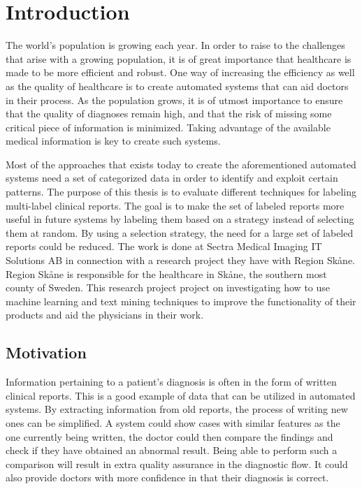 \chapter{Introduction}
\label{cha:introduction}

The world's population is growing each year. 
In order to raise to the challenges that arise with a growing population, it is of great importance that healthcare is made to be more efficient and robust.
One way of increasing the efficiency as well as the quality of healthcare is to create automated systems that can aid doctors in their process.
As the population grows, it is of utmost importance to ensure that the quality of diagnoses remain high, and that the risk of missing some critical piece of information is minimized.
Taking advantage of the available medical information is key to create such systems.

Most of the approaches that exists today to create the aforementioned automated systems need a set of categorized data in order to identify and exploit certain patterns.
The purpose of this thesis is to evaluate different techniques for labeling multi-label clinical reports.
The goal is to make the set of labeled reports more useful in future systems by labeling them based on a strategy instead of selecting them at random.
By using a selection strategy, the need for a large set of labeled reports could be reduced.
The work is done at Sectra Medical Imaging IT Solutions AB in connection with a research project they have with Region Skåne.
Region Skåne is responsible for the healthcare in Skåne, the southern most county of Sweden.
This research project project on investigating how to use machine learning and text mining techniques to improve the functionality of their products and aid the physicians in their work.

\section{Motivation}
\label{sec:motivation}

Information pertaining to a patient's diagnosis is often in the form of written clinical reports.
This is a good example of data that can be utilized in automated systems.
By extracting information from old reports, the process of writing new ones can be simplified.
A system could show cases with similar features as the one currently being written, the doctor could then compare the findings and check if they have obtained an abnormal result.
Being able to perform such a comparison will result in extra quality assurance in the diagnostic flow.
It could also provide doctors with more confidence in that their diagnosis is correct.

